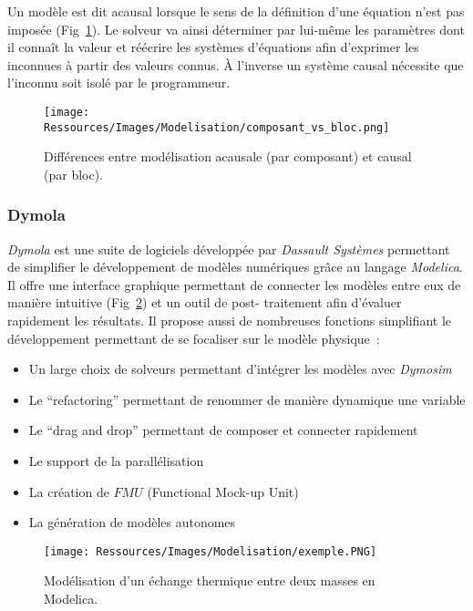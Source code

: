 \begin{Def}[Acausal]\label{def:acausal}
Un modèle est dit acausal lorsque le sens de la définition d’une équation n’est pas
imposée (Fig~\ref{fig:acausal_vs_causal}). Le solveur va ainsi déterminer par lui-même les
paramètres dont il connaît la valeur et réécrire les systèmes d’équations afin d’exprimer
les inconnues à partir des valeurs connus. À l’inverse un système causal nécessite
que l’inconnu soit isolé par le programmeur.
\end{Def}

\begin{figure}
    \begin{center}
        \texttt{[image: Ressources/Images/Modelisation/composant\_vs\_bloc.png]}
    \end{center}
    \caption{Différences entre modélisation acausale (par composant) et causal (par bloc).
             \label{fig:acausal_vs_causal}}
\end{figure}

\subsubsection{Dymola} %
\label{ssub:dymola}
\emph{Dymola} est une suite de logiciels développée par \emph{Dassault Systèmes}
permettant de simplifier le développement de modèles numériques grâce au langage
\emph{Modelica}. Il offre une interface graphique permettant de connecter les modèles
entre eux de manière intuitive (Fig~\ref{fig:exemple_modelica}) et un outil de post-
traitement afin d’évaluer rapidement les résultats. Il propose aussi de nombreuses fonctions
simplifiant le développement permettant de se focaliser sur le modèle physique~:
\begin{itemize}
    \item Un large choix de solveurs permettant d’intégrer les modèles avec \emph{Dymosim}
    \item Le \enquote{refactoring} permettant de renommer de manière dynamique une variable
    \item Le \enquote{drag and drop} permettant de composer et connecter rapidement
    \item Le support de la parallélisation
    \item La création de $FMU$ (Functional Mock-up Unit)
    \item La génération de modèles autonomes
\end{itemize}

\begin{figure}
    \begin{center}
        \texttt{[image: Ressources/Images/Modelisation/exemple.PNG]}
    \end{center}
    \caption{Modélisation d’un échange thermique entre deux masses en Modelica.
             \label{fig:exemple_modelica}}
\end{figure}


